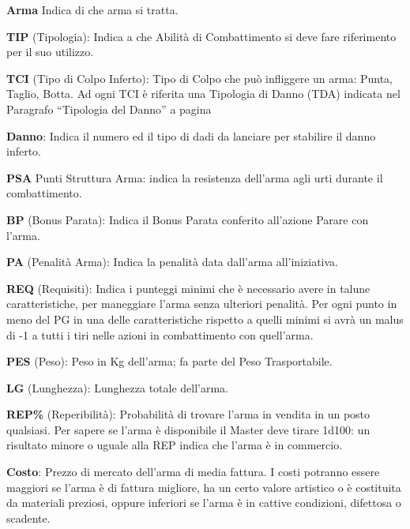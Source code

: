 \begin{description}

\item{\bf Arma} Indica di che arma si tratta.    
  
\item{\bf TIP} (Tipologia): Indica a che Abilit\`a di Combattimento si
  deve fare riferimento per il suo utilizzo.

\item{\bf TCI} (Tipo di Colpo Inferto): Tipo di Colpo che
  pu\`o infliggere un arma: Punta, Taglio, Botta. Ad ogni TCI \`e
  riferita una Tipologia di Danno (TDA) indicata nel Paragrafo
  ``Tipologia del Danno'' a pagina \pageref{tipodanno}
  
\item{\bf Danno}: Indica il numero ed il tipo di dadi da lanciare per
  stabilire il danno inferto.  

\item{\bf PSA} Punti Struttura Arma: indica la
  resistenza dell'arma agli urti durante il combattimento.
  
\item{\bf BP} (Bonus Parata): Indica il Bonus Parata conferito all'azione
  Parare con l'arma.
  
\item{\bf PA} (Penalit\`a Arma): Indica la penalit\`a data dall'arma
  all'iniziativa.

\item{\bf REQ} (Requisiti): Indica i punteggi minimi che \`e necessario
  avere in talune caratteristiche, per maneggiare l'arma senza
  ulteriori penalit\`a.  Per ogni punto in meno del PG in una delle
  caratteristiche rispetto a quelli minimi si avr\`a un malus di -1
  a tutti i tiri nelle azioni in combattimento con quell'arma.
  
\item{\bf PES} (Peso): Peso in Kg dell'arma; fa parte del Peso
  Trasportabile.

\item{\bf LG} (Lunghezza): Lunghezza totale dell'arma.  
  
\item{\bf REP\%} (Reperibilit\`a): Probabilit\`a di trovare
  l'arma in vendita in un posto qualsiasi. Per sapere se l'arma \`e
  disponibile il Master deve tirare 1d100: un risultato minore o
  uguale alla REP indica che l'arma \`e in commercio.
  
\item{\bf Costo}: Prezzo di mercato dell'arma di media fattura.  I
  costi potranno essere maggiori se l'arma \`e di fattura migliore,
  ha un certo valore artistico o \`e costituita da materiali
  preziosi, oppure inferiori se l'arma \`e in cattive condizioni,
  difettosa o scadente. 
  

\end{description}
